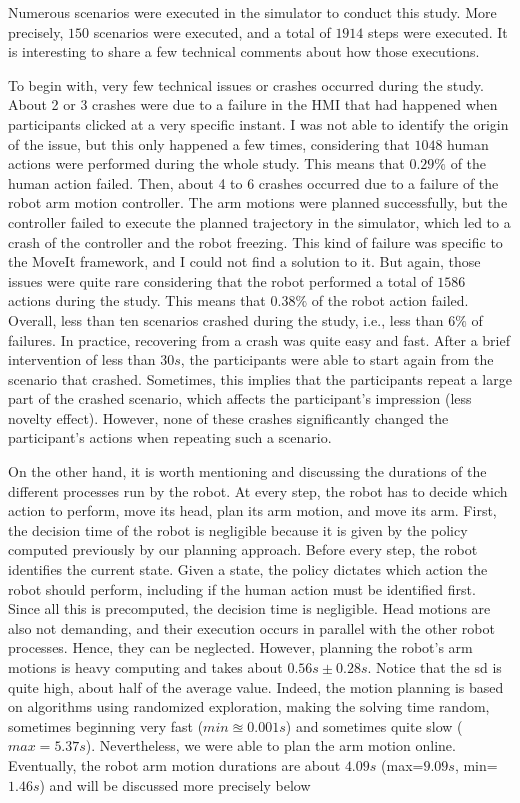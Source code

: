 Numerous scenarios were executed in the simulator to conduct this study. More precisely, $150$ scenarios were executed, and a total of $1914$ steps were executed. It is interesting to share a few technical comments about how those executions.

To begin with, very few technical issues or crashes occurred during the study.
About 2 or 3 crashes were due to a failure in the HMI that had happened when participants clicked at a very specific instant. I was not able to identify the origin of the issue, but this only happened a few times, considering that $1048$ human actions were performed during the whole study. This means that $0.29\%$ of the human action failed. 
Then, about 4 to 6 crashes occurred due to a failure of the robot arm motion controller. The arm motions were planned successfully, but the controller failed to execute the planned trajectory in the simulator, which led to a crash of the controller and the robot freezing. This kind of failure was specific to the MoveIt framework, and I could not find a solution to it. But again, those issues were quite rare considering that the robot performed a total of $1586$ actions during the study. This means that $0.38\%$ of the robot action failed. 
Overall, less than ten scenarios crashed during the study, i.e., less than $6\%$ of failures. 
In practice, recovering from a crash was quite easy and fast. After a brief intervention of less than $30s$, the participants were able to start again from the scenario that crashed. Sometimes, this implies that the participants repeat a large part of the crashed scenario, which affects the participant's impression (less novelty effect). However, none of these crashes significantly changed the participant's actions when repeating such a scenario.


On the other hand, it is worth mentioning and discussing the durations of the different processes run by the robot.
At every step, the robot has to decide which action to perform, move its head, plan its arm motion, and move its arm. First, the decision time of the robot is negligible because it is given by the policy computed previously by our planning approach. Before every step, the robot identifies the current state. Given a state, the policy dictates which action the robot should perform, including if the human action must be identified first. Since all this is precomputed, the decision time is negligible. 
Head motions are also not demanding, and their execution occurs in parallel with the other robot processes. Hence, they can be neglected.
However, planning the robot's arm motions is heavy computing and takes about $0.56s \pm 0.28s$. Notice that the \acrfull{sd} is quite high, about half of the average value. Indeed, the motion planning is based on algorithms using randomized exploration, making the solving time random, sometimes beginning very fast ($min \approxeq 0.001s$) and sometimes quite slow ($max = 5.37s $). Nevertheless, we were able to plan the arm motion online.
Eventually, the robot arm motion durations are about $4.09s$ (max=$9.09s$, min=$1.46s$) and will be discussed more precisely below

